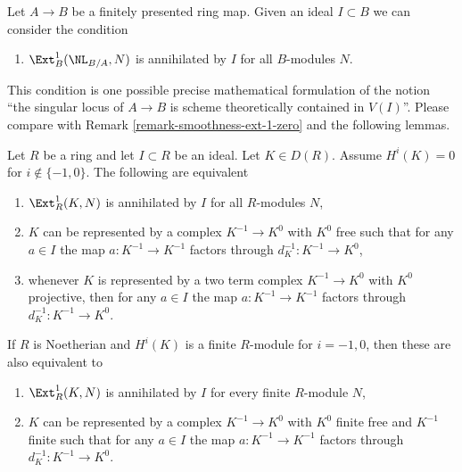 \noindent
Let $A \to B$ be a finitely presented ring map.
Given an ideal $I \subset B$ we can consider the condition
\begin{enumerate}
\item[(*)]
$\Ext^1_B(\NL_{B/A}, N)$ is annihilated by $I$ for all $B$-modules $N$.
\end{enumerate}
This condition is one possible precise mathematical formulation of
the notion ``the singular locus of $A \to B$ is scheme theoretically
contained in $V(I)$''. Please compare with
Remark \ref{remark-smoothness-ext-1-zero} and the following lemmas.

\begin{lemma}
\label{lemma-ext-1-annihilated-definite}
Let $R$ be a ring and let $I \subset R$ be an ideal.
Let $K \in D(R)$. Assume $H^i(K) = 0$ for $i \not \in \{-1, 0\}$.
The following are equivalent
\begin{enumerate}
\item $\Ext^1_R(K, N)$ is annihilated by $I$ for all $R$-modules $N$,
\item $K$ can be represented by a complex $K^{-1} \to K^0$
with $K^0$ free such that for any $a \in I$ the map
$a : K^{-1} \to K^{-1}$ factors through $d_K^{-1} : K^{-1} \to K^0$,
\item whenever $K$ is represented by a two term complex
$K^{-1} \to K^0$ with $K^0$ projective, then for any $a \in I$ the map
$a : K^{-1} \to K^{-1}$ factors through $d_K^{-1} : K^{-1} \to K^0$.
\end{enumerate}
If $R$ is Noetherian and $H^i(K)$ is a finite $R$-module for $i = -1, 0$,
then these are also equivalent to
\begin{enumerate}
\item[(4)] $\Ext^1_R(K, N)$ is annihilated by $I$ for every finite
$R$-module $N$,
\item[(5)] $K$ can be represented by a complex $K^{-1} \to K^0$
with $K^0$ finite free and $K^{-1}$ finite such that for any $a \in I$ the map
$a : K^{-1} \to K^{-1}$ factors through $d_K^{-1} : K^{-1} \to K^0$.
\end{enumerate}
\end{lemma}

